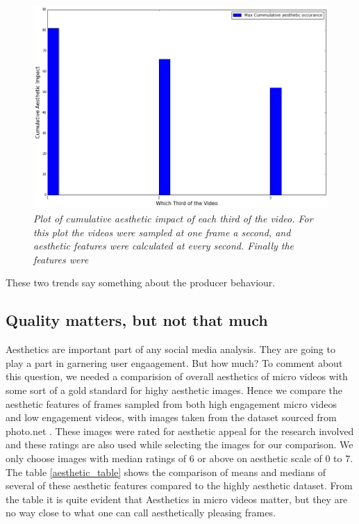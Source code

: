 \begin{figure}[!htb]
\centering
\includegraphics[width=\columnwidth]{plots/cumulativeAestheticImpact}
\caption{\textsl{ Plot of cumulative aesthetic impact of each third of the video. For this plot the videos were sampled at one frame a second, and aesthetic features were calculated at every second. Finally the features were  }}
\label{fig:Aesthetic_trends}
\end{figure} 

These two trends say something about the producer behaviour. 

\subsection{Quality matters, but not that much}

Aesthetics are important part of any social media analysis. They are going to play a part in garnering user engaagement. But how much? 
To comment about this question, we needed a comparision of overall aesthetics of micro videos with some sort of a gold standard for highy aesthetic images. Hence we compare the aesthetic features of frames sampled from both high engagement micro videos and low engagement videos, with images taken from the dataset sourced from photo.net \cite{datta2008algorithmic}. These images were rated for aesthetic appeal for the research involved and these ratings are also used while selecting the images for our comparison. We only choose images with median ratings of 6 or above on aesthetic scale of 0 to 7.  The table \ref{aesthetic_table} shows the comparison of means and medians of several of these aesthetic features compared to the highly aesthetic dataset. From the table it is quite evident that Aesthetics in micro videos matter, but they are no way close to what one can call aesthetically pleasing frames. 

